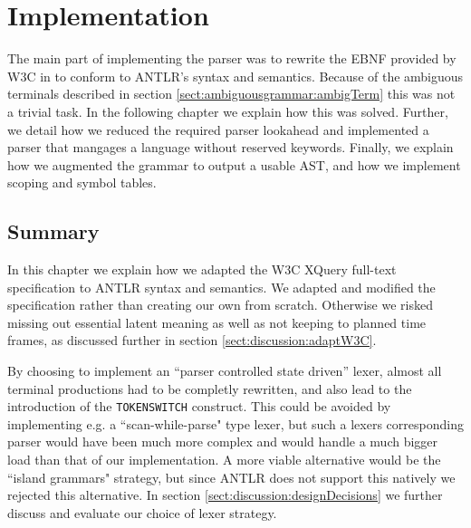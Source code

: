 \chapter{Implementation}
\label{chapter:implementation}

The main part of implementing the parser was to rewrite the EBNF provided by
W3C in \cite{w3c01} to conform to ANTLR's syntax and semantics. Because of the
ambiguous terminals described in section \ref{sect:ambiguousgrammar:ambigTerm}
this was not a trivial task. In the following chapter we explain how this
was solved. Further, we detail how we reduced the required parser
lookahead and implemented a parser that mangages a language without reserved
keywords. Finally, we explain how we augmented the grammar to output a
usable AST, and how we implement scoping and symbol tables.













\section{Summary}
In this chapter we explain how we adapted the W3C
XQuery full-text specification to ANTLR syntax and semantics. We adapted and
modified the specification rather than creating our own from scratch. Otherwise
we risked missing out essential latent meaning as well as not keeping to planned
time frames, as discussed further in section \ref{sect:discussion:adaptW3C}.    

By choosing to implement an ``parser controlled state driven'' lexer, almost all
terminal productions  had to be completly rewritten, and also lead to the
introduction of the \verb!TOKENSWITCH! construct. This could be avoided by
implementing e.g. a ``scan-while-parse" type lexer, but such a lexers
corresponding parser would have been much more complex and would handle a much
bigger load than that of our implementation. A more viable alternative would be
the ``island grammars" strategy, but since ANTLR does not support this natively we
rejected this alternative. In section \ref{sect:discussion:designDecisions} we
further discuss and evaluate our choice of lexer strategy.

